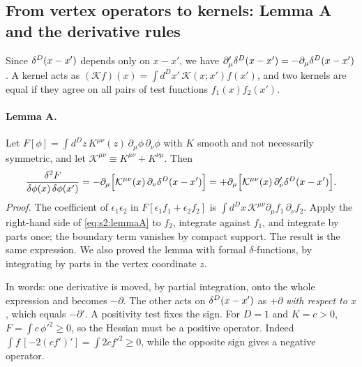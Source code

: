 \documentclass[aps,prd,onecolumn,10pt,nofootinbib,floatfix]{revtex4-2}
\begin{document}
\subsection{From vertex operators to kernels: Lemma A and the derivative rules}
\label{sec:s2:rules}

Since $\delta^D(x-x')$ depends only on $x-x'$, we have
$\partial'_\mu\delta^D(x-x')=-\partial_\mu\delta^D(x-x')$. A kernel acts as
$(\mathcal K f)(x)=\int d^Dx'\,\mathcal K(x;x')f(x')$, and two kernels are
equal if they agree on all pairs of test functions $f_1(x)f_2(x')$.

\paragraph*{Lemma A.}
Let $F[\phi]=\int d^Dz\,K^{\mu\nu}(z)\,\partial_\mu\phi\,\partial_\nu\phi$
with $K$ smooth and not necessarily symmetric, and let
$\mathcal K^{\mu\nu}\equiv K^{\mu\nu}+K^{\nu\mu}$. Then
\begin{equation}
\frac{\delta^2F}{\delta\phi(x)\,\delta\phi(x')}
=-\partial_\mu\Big[\mathcal K^{\mu\nu}(x)\,\partial_\nu\delta^D(x-x')\Big]
=+\partial_\mu\Big[\mathcal K^{\mu\nu}(x)\,\partial'_\nu\delta^D(x-x')\Big].
\label{eq:s2:lemmaA}
\end{equation}
\emph{Proof.} The coefficient of $\epsilon_1\epsilon_2$ in
$F[\epsilon_1f_1+\epsilon_2f_2]$ is
$\int d^Dx\,\mathcal K^{\mu\nu}\partial_\mu f_1\,\partial_\nu f_2$. Apply the
right-hand side of \eqref{eq:s2:lemmaA} to $f_2$, integrate against $f_1$,
and integrate by parts once; the boundary term vanishes by compact support.
The result is the same expression. We also proved the lemma with formal
$\delta$-functions, by integrating by parts in the vertex coordinate $z$.

In words: one derivative is moved, by partial integration, onto the whole
expression and becomes $-\partial$. The other acts on $\delta^D(x-x')$ as $+\partial$
\emph{with respect to $x$}, which equals $-\partial'$. A positivity test
fixes the sign. For $D=1$ and $K=c>0$, $F=\int c\,\phi'^2\ge0$, so the
Hessian must be a positive operator. Indeed
$\int f\,[-2(cf')']=\int2cf'^2\ge0$, while the opposite sign gives a
negative operator.
\end{document}
